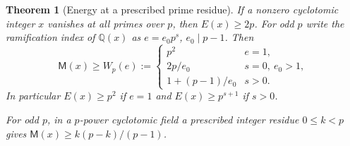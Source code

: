 \documentclass[11pt,a4paper]{article}
\numberwithin{equation}{section}
\newtheorem{theorem}{Theorem}[section]
\theoremstyle{remark}
\newcommand{\QQ}{\mathbb Q}
\begin{document}
\begin{theorem}[Energy at a prescribed prime residue]\label{fam:M:5.3}\label{thm:cyclotomic-residue-energy}
\label{prop:odd-defect-filtration}\label{lem:singleton-residue-energy}\label{lem:codegree-four-residue-energy}
If a nonzero cyclotomic integer $x$ vanishes at all primes over $p$,
then $E(x)\ge2p$. For odd $p$ write the ramification index of
$\QQ(x)$ as $e=e_0p^s$, $e_0\mid p-1$. Then
\[
 \mathsf M(x)\ge W_p(e):=
 \begin{cases}
 p^2 & e=1,\\
 2p/e_0 &s=0,\ e_0>1,\\
 1+(p-1)/e_0 & s>0 .
 \end{cases}
\]
In particular $E(x)\ge p^2$ if $e=1$ and
$E(x)\ge p^{s+1}$ if $s>0$.

For odd $p$, in a $p$-power cyclotomic field a prescribed integer residue
$0\le k<p$ gives $\mathsf M(x)\ge k(p-k)/(p-1)$.
\end{theorem}
\end{document}
